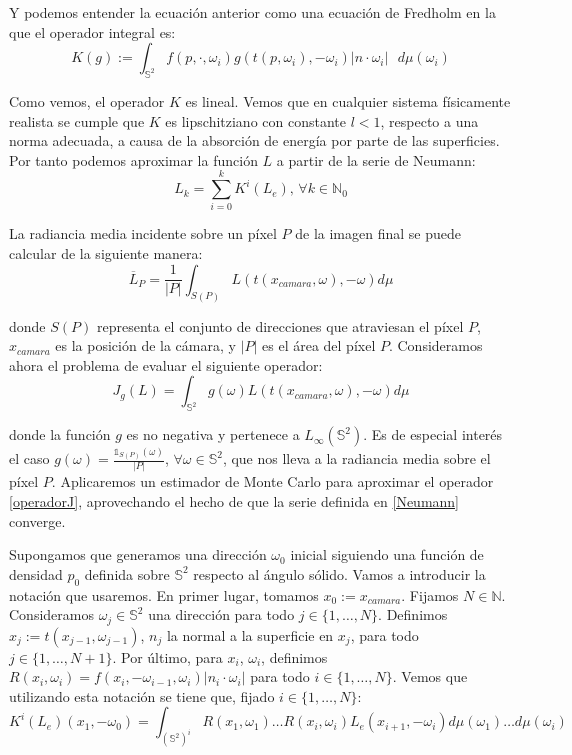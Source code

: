 Y podemos entender la ecuación anterior como una ecuación de Fredholm en la que el operador integral es:
$$K(g) := \int _{\mathds{S}^2}f(p,\cdot, \omega _i) g(t(p,\omega_i), -\omega _i) |n\cdot \omega _i|\text{ }d\mu (\omega _i)$$

Como vemos, el operador $K$ es lineal. Vemos que en cualquier sistema físicamente realista se cumple que $K$ es lipschitziano con constante $l<1$, respecto a una norma adecuada, a causa de la absorción de energía por parte de las superficies. Por tanto podemos aproximar la función $L$ a partir de la serie de Neumann:
\begin{equation}\label{Neumann}
L_k = \sum_{i=0}^kK^i(L_e)\text{, }\forall k\in\mathds{N}_0
\end{equation}

La radiancia media incidente sobre un píxel $P$ de la imagen final se puede calcular de la siguiente manera:
\begin{equation}\label{pixel}
\overline{L}_P=\frac{1}{|P|}\int_{S(P)}L(t(x_{camara}, \omega), -\omega)d\mu
\end{equation}

donde $S(P)$ representa el conjunto de direcciones que atraviesan el píxel $P$, $x_{camara}$ es la posición de la cámara, y $|P|$ es el área del píxel $P$. Consideramos ahora el problema de evaluar el siguiente operador:
\begin{equation}\label{operadorJ}
J_g(L)=\int_{\mathds{S}^2}g(\omega)L(t(x_{camara}, \omega),-\omega)d\mu
\end{equation}

donde la función $g$ es no negativa y pertenece a $L_{\infty}(\mathds{S}^2)$. Es de especial interés el caso $g(\omega) = \frac{\mathds{1}_{S(P)}(\omega)}{|P|}$, $\forall \omega\in\mathds{S}^2$, que nos lleva a la radiancia media sobre el píxel $P$. Aplicaremos un estimador de Monte Carlo para aproximar el operador \ref{operadorJ}, aprovechando el hecho de que la serie definida en \ref{Neumann} converge.

Supongamos que generamos una dirección $\omega_0$ inicial siguiendo una función de densidad $p_0$ definida sobre $\mathds{S}^2$ respecto al ángulo sólido. Vamos a introducir la notación que usaremos. En primer lugar, tomamos $x_0:=x_{camara}$. Fijamos $N\in\mathds{N}$. Consideramos $\omega_j\in\mathds{S}^2$ una dirección para todo $j\in\{1,\ldots ,N\}$. Definimos $x_j:=t(x_{j-1}, \omega_{j-1})$, $n_j$ la normal a la superficie en $x_j$, para todo $j\in\{1,\ldots ,N+1\}$. Por último, para $x_i$, $\omega_i$, definimos $R(x_i,\omega_i) = f(x_i,-\omega_{i-1},\omega_i) |n_i\cdot \omega_i|$ para todo $i\in\{1,\ldots ,N\}$. Vemos que utilizando esta notación se tiene que, fijado $i\in\{1,\ldots, N\}$:
\begin{equation}\label{termino2}
K^i(L_e)(x_1, -\omega_0) = \int_{(\mathds{S}^2)^i}R(x_1,\omega_1)\ldots R(x_i,\omega_i)L_e(x_{i+1},-\omega_i)d\mu(\omega_1)\ldots d\mu(\omega_i)
\end{equation}

